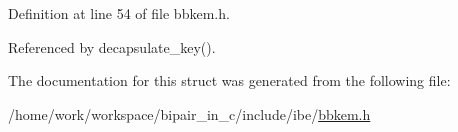 Definition at line 54 of file bbkem.\-h.



Referenced by decapsulate\-\_\-key().



The documentation for this struct was generated from the following file\-:\begin{DoxyCompactItemize}
\item 
/home/work/workspace/bipair\-\_\-in\-\_\-c/include/ibe/\hyperlink{bbkem_8h}{bbkem.\-h}\end{DoxyCompactItemize}
